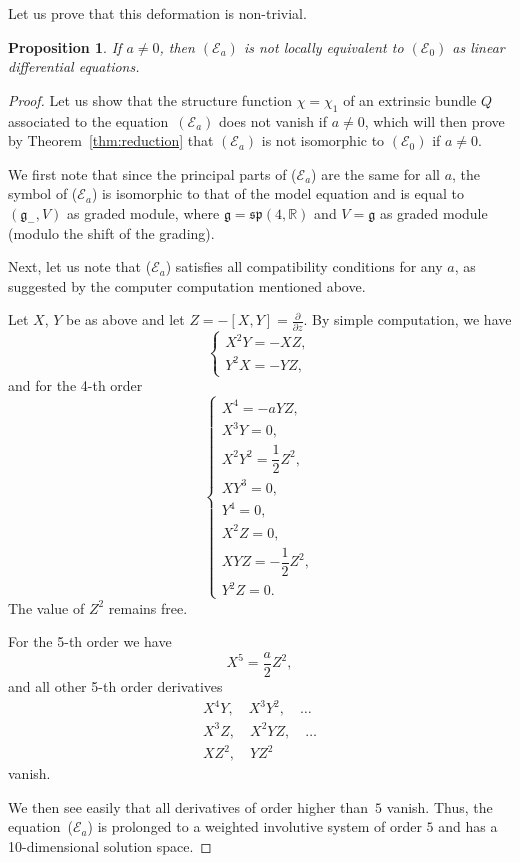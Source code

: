 \documentclass[10pt,a4paper]{amsart}
\newcommand{\R}{\mathbb R}
\newcommand{\E}{\mathcal E}
\newcommand{\g}{\mathfrak g}
\newcommand{\fsp}{\mathfrak{sp}}
\newtheorem{prop}[thm]{Proposition}
\numberwithin{equation}{section}
\begin{document}
Let us prove that this deformation is non-trivial.
\begin{prop}\label{deformCase2}
	If $a\ne 0$, then $(\E_a)$ is not locally equivalent to $(\E_0)$ as linear differential equations.
\end{prop}	
\begin{proof}
	Let us show that the structure function $\chi=\chi_1$ of an extrinsic bundle $Q$ associated to the equation~$(\E_a)$ does not vanish if $a\ne 0$, which will then prove by Theorem~\ref{thm:reduction} that $(\E_a)$ is not isomorphic to $(\E_0)$ if $a\ne 0$.
	
	We first note that since the principal parts of ($\E_a$) are the same for all $a$, the symbol of ($\E_a$) is isomorphic to that of the model equation and is equal to $(\g_{-},V)$ as graded module, where $\g=\fsp(4,\R)$ and $V=\g$ as graded module (modulo the shift of the grading).
	
	Next, let us note that ($\E_a$) satisfies all compatibility conditions for any $a$, as suggested by the computer computation mentioned above.
	
	Let $X$, $Y$ be as above and let $Z=-[X,Y]=\frac{\partial}{\partial z}$. By simple computation, we have
	\[
	\begin{cases}
	X^2Y=-XZ,\\
	Y^2X = -YZ,
	\end{cases}
	\]
	and for the 4-th order
	\[
	\begin{cases}
	X^4 = -aYZ,\\
	X^3Y = 0,\\[1ex]
	X^2Y^2 =\dfrac12 Z^2,\\[1ex]
	XY^3=0,\\
	Y^4=0,\\
	X^2Z = 0,\\[1ex]
	XYZ = -\dfrac12 Z^2,\\[1ex]
	Y^2Z = 0.
	\end{cases}
	\]
	The value of $Z^2$ remains free.
	
	For the 5-th order we have
	\[
	X^5 = \frac{a}{2} Z^2,
	\]
	and all other 5-th order derivatives
	\begin{gather*}
	X^4Y,\quad X^3Y^2,\quad \dots \\
	X^3Z,\quad X^2YZ,\quad \dots \\
	XZ^2,\quad YZ^2
	\end{gather*}
	vanish.
	
	We then see easily that all derivatives of order higher than~$5$ vanish. Thus, the equation~($\E_a$) is prolonged to a weighted involutive system of order $5$ and has a 10-dimensional solution space.
	

\end{proof}
\end{document}
